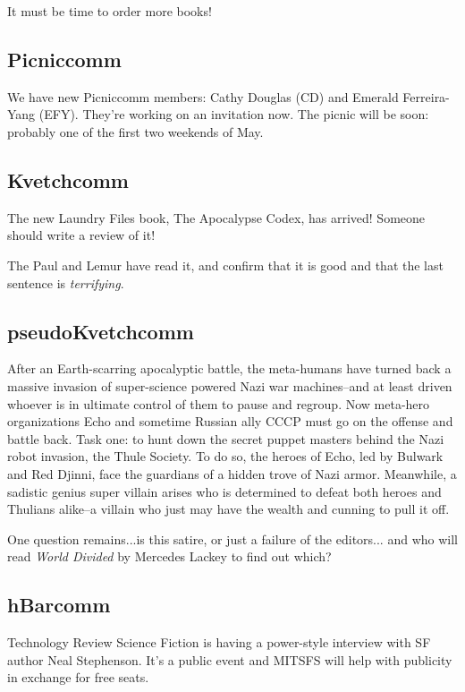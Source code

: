 \documentclass[10pt]{article}
\begin{document}
It must be time to order more books!


\subsection*{Picniccomm}

We have new Picniccomm members: Cathy Douglas (CD) and Emerald 
Ferreira-Yang (EFY).  They're working on an invitation now.
The picnic will be soon: probably one of the first two weekends
of May.


\subsection*{Kvetchcomm}

The new Laundry Files book, The Apocalypse Codex, has arrived! 
Someone should write a review of it!

The Paul and Lemur have read it, and confirm that it is good and
that the last sentence is \emph{terrifying}. 


\subsection*{pseudoKvetchcomm}

After an Earth-scarring apocalyptic battle, the meta-humans have turned back a massive invasion of super-science powered Nazi war machines--and at least driven whoever is in ultimate control of them to pause and regroup. Now meta-hero organizations Echo and sometime Russian ally CCCP must go on the offense and battle back. Task one: to hunt down the secret puppet masters behind the Nazi robot invasion, the Thule Society. To do so, the heroes of Echo, led by Bulwark and Red Djinni, face the guardians of a hidden trove of Nazi armor. Meanwhile, a sadistic genius super villain arises who is determined to defeat both heroes and Thulians alike--a villain who just may have the wealth and cunning to pull it off.

One question remains...is this satire, or just a failure of the editors...
and who will read \emph{World Divided} by Mercedes Lackey to find out which?


\subsection*{hBarcomm}

Technology Review Science Fiction is having a power-style 
interview with SF author Neal Stephenson. It's a public event
and MITSFS will help with publicity in exchange for free seats.
\end{document}
